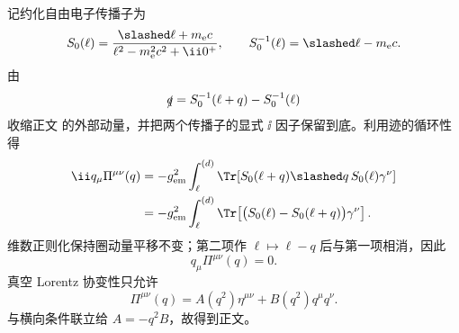 \begin{derivation}[真空极化张量的横向性]
记约化自由电子传播子为
\begin{equation*}
 S_0(\ell)=\frac{\slashed\ell+m_{\mathrm e} c}{\ell^2-m_{\mathrm e}^2c^2+\ii0^+},
 \qquad
 S_{0}^{-1}(\ell)=\slashed\ell-m_{\mathrm e} c .
\end{equation*}
由
\begin{equation*}
 \slashed q=S_0^{-1}(\ell+q)-S_0^{-1}(\ell)
\end{equation*}
收缩正文 的外部动量，并把两个传播子的显式 $\ii$ 因子保留到底。利用迹的循环性得
\begin{align*}
 \ii q_\mu\Pi^{\mu\nu}(q)
 &=-g_{\rm em}^2
 \int_\ell^{(d)}
 \Tr\!\left[
 S_0(\ell+q)\slashed q\,S_0(\ell)\gamma^\nu
 \right]\\
 &=-g_{\rm em}^2
 \int_\ell^{(d)}
 \Tr\!\left[
 \bigl(S_0(\ell)-S_0(\ell+q)\bigr)\gamma^\nu
 \right].
\end{align*}
维数正则化保持圈动量平移不变；第二项作 \(\ell\mapsto\ell-q\) 后与第一项相消，因此
\begin{equation*}
 q_\mu\Pi^{\mu\nu}(q)=0.
\end{equation*}
真空 Lorentz 协变性只允许
\begin{equation*}
 \Pi^{\mu\nu}(q)=A(q^2)\eta^{\mu\nu}+B(q^2)q^\mu q^\nu .
\end{equation*}
与横向条件联立给 \(A=-q^2B\)，故得到正文。
\end{derivation}

